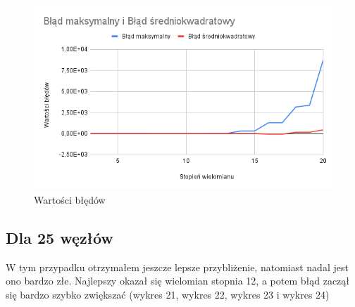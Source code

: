 \documentclass{article}
\begin{document}
\begin{figure}[H]
  \centering
  \begin{minipage}[b]{0.4\textwidth}
    \includegraphics[width=\textwidth]{img20.png}
    \caption{Wartości błędów}
  \end{minipage}
\end{figure}

\newpage

\subsection{Dla 25 węzłów}

W tym przypadku otrzymałem jeszcze lepsze przybliżenie, natomiast nadal jest ono bardzo złe. Najlepszy okazał się wielomian stopnia 12, a potem błąd zaczął się bardzo szybko zwiększać (wykres 21, wykres 22, wykres 23 i wykres 24)
\end{document}
